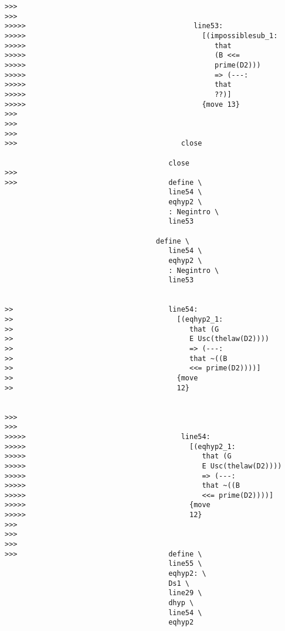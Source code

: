 \documentclass[12pt]{article}
\begin{document}
\begin{verbatim}
>>>
>>>
>>>>>                                        line53:
>>>>>                                          [(impossiblesub_1:
>>>>>                                             that
>>>>>                                             (B <<=
>>>>>                                             prime(D2)))
>>>>>                                             => (---:
>>>>>                                             that
>>>>>                                             ??)]
>>>>>                                          {move 13}
>>>
>>>
>>>
>>>                                       close

                                       close
>>>
>>>                                    define \
                                       line54 \
                                       eqhyp2 \
                                       : Negintro \
                                       line53

                                    define \
                                       line54 \
                                       eqhyp2 \
                                       : Negintro \
                                       line53


>>                                     line54:
>>                                       [(eqhyp2_1:
>>                                          that (G
>>                                          E Usc(thelaw(D2))))
>>                                          => (---:
>>                                          that ~((B
>>                                          <<= prime(D2))))]
>>                                       {move
>>                                       12}


>>>
>>>
>>>>>                                     line54:
>>>>>                                       [(eqhyp2_1:
>>>>>                                          that (G
>>>>>                                          E Usc(thelaw(D2))))
>>>>>                                          => (---:
>>>>>                                          that ~((B
>>>>>                                          <<= prime(D2))))]
>>>>>                                       {move
>>>>>                                       12}
>>>
>>>
>>>
>>>                                    define \
                                       line55 \
                                       eqhyp2: \
                                       Ds1 \
                                       line29 \
                                       dhyp \
                                       line54 \
                                       eqhyp2


\end{verbatim}
\end{document}
